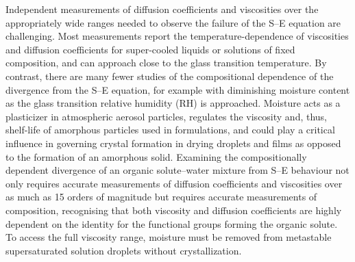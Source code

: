 Independent measurements of diffusion coefficients and viscosities over the appropriately wide ranges needed to observe the failure of the S–E equation are challenging. Most measurements report the temperature-dependence of viscosities and diffusion coefficients for super-cooled liquids or solutions of fixed composition, and can approach close to the glass transition temperature\cite{chenStokesEinsteinRelationSupercooled2006,Shrestha2015,Chen2006a,Gonzalez2015}. By contrast, there are many fewer studies of the compositional dependence of the divergence from the S–E equation, for example with diminishing moisture content as the glass transition relative humidity (RH) is approached\cite{powerTransitionLiquidSolidlike2013,Price2014,Price2015,Chenyakin2017,price2016sucrose,Bastelberger2017a}. Moisture acts as a plasticizer in atmospheric aerosol particles, regulates the viscosity and, thus, shelf-life of amorphous particles used in formulations, and could play a critical influence in governing crystal formation in drying droplets and films as opposed to the formation of an amorphous solid. Examining the compositionally dependent divergence of an organic solute–water mixture from S–E behaviour not only requires accurate measurements of diffusion coefficients and viscosities over as much as \num{15} orders of magnitude but requires accurate measurements of composition, recognising that both viscosity and diffusion coefficients are highly dependent on the identity for the functional groups forming the organic solute\cite{rothfuss2017influence}. To access the full viscosity range, moisture must be removed from metastable supersaturated solution droplets without crystallization. 

